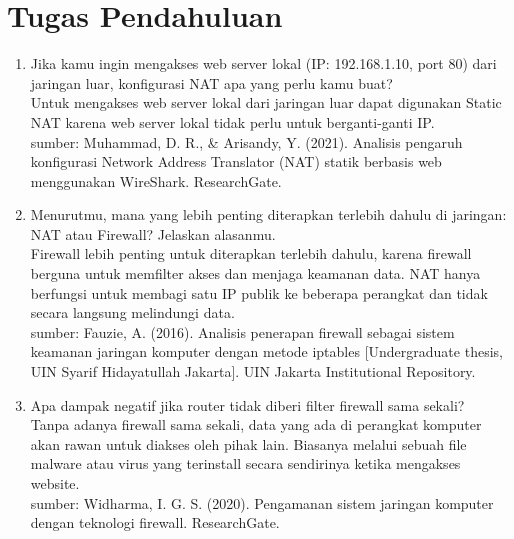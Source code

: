 \section{Tugas Pendahuluan}
\begin{enumerate}
	\item Jika kamu ingin mengakses web server lokal (IP: 192.168.1.10, port 80) dari jaringan luar, konfigurasi NAT apa yang perlu kamu buat?\\
	Untuk mengakses web server lokal dari jaringan luar dapat digunakan Static NAT karena web server lokal tidak perlu untuk berganti-ganti IP.\\
	sumber: Muhammad, D. R., \& Arisandy, Y. (2021). Analisis pengaruh konfigurasi Network Address Translator (NAT) statik berbasis web menggunakan WireShark. ResearchGate.
	\item Menurutmu, mana yang lebih penting diterapkan terlebih dahulu di jaringan: NAT atau Firewall? Jelaskan alasanmu.\\
	Firewall lebih penting untuk diterapkan terlebih dahulu, karena firewall berguna untuk memfilter akses dan menjaga keamanan data. NAT hanya berfungsi untuk membagi satu IP publik ke beberapa perangkat dan tidak secara langsung melindungi data.\\
	sumber: Fauzie, A. (2016). Analisis penerapan firewall sebagai sistem keamanan jaringan komputer dengan metode iptables [Undergraduate thesis, UIN Syarif Hidayatullah Jakarta]. UIN Jakarta Institutional Repository.
	\item Apa dampak negatif jika router tidak diberi filter firewall sama sekali?\\
	Tanpa adanya firewall sama sekali, data yang ada di perangkat komputer akan rawan untuk diakses oleh pihak lain. Biasanya melalui sebuah file malware atau virus yang terinstall secara sendirinya ketika mengakses website.\\
	sumber: Widharma, I. G. S. (2020). Pengamanan sistem jaringan komputer dengan teknologi firewall. ResearchGate.
\end{enumerate}
